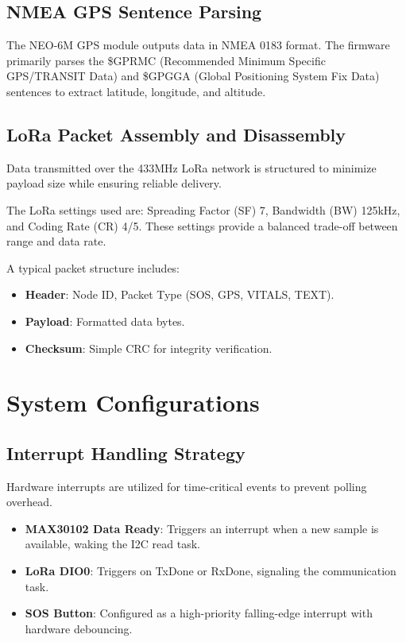\subsection{NMEA GPS Sentence Parsing}

The NEO-6M GPS module outputs data in NMEA 0183 format. The firmware primarily parses the \$GPRMC (Recommended Minimum Specific GPS/TRANSIT Data) and \$GPGGA (Global Positioning System Fix Data) sentences to extract latitude, longitude, and altitude.

\subsection{LoRa Packet Assembly and Disassembly}

Data transmitted over the 433MHz LoRa network is structured to minimize payload size while ensuring reliable delivery. 

\begin{infobox}
The LoRa settings used are: Spreading Factor (SF) 7, Bandwidth (BW) 125kHz, and Coding Rate (CR) 4/5. These settings provide a balanced trade-off between range and data rate.
\end{infobox}

A typical packet structure includes:
\begin{itemize}
    \item \textbf{Header}: Node ID, Packet Type (SOS, GPS, VITALS, TEXT).
    \item \textbf{Payload}: Formatted data bytes.
    \item \textbf{Checksum}: Simple CRC for integrity verification.
\end{itemize}

\section{System Configurations}

\subsection{Interrupt Handling Strategy}
Hardware interrupts are utilized for time-critical events to prevent polling overhead. 
\begin{itemize}
    \item \textbf{MAX30102 Data Ready}: Triggers an interrupt when a new sample is available, waking the I2C read task.
    \item \textbf{LoRa DIO0}: Triggers on TxDone or RxDone, signaling the communication task.
    \item \textbf{SOS Button}: Configured as a high-priority falling-edge interrupt with hardware debouncing.
\end{itemize}

